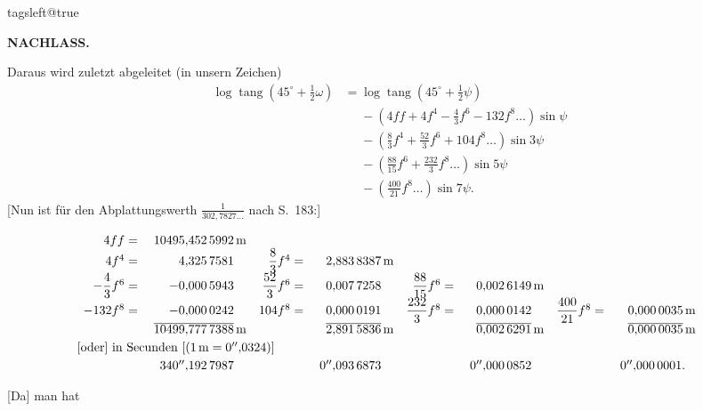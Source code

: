 \begingroup
\csname tagsleft@true\endcsname
\par\clearpage
\noindent{}\hfill{\small\textbf{NACHLASS.}}\hfill\null\par\medskip

Daraus wird zuletzt abgeleitet (in unsern Zeichen)
\[
\begin{aligned}
\log\operatorname{tang}(45^\circ+\tfrac12\omega)&=\log\operatorname{tang}(45^\circ+\tfrac12\psi)\\
&\phantom{={}}-\left(4ff+4f^4-\frac43f^6-132f^8\ldots\right)\sin\psi\\
&\phantom{={}}-\left(\frac83f^4+\frac{52}3f^6+104f^8\ldots\right)\sin3\psi\\
&\phantom{={}}-\left(\frac{88}{15}f^6+\frac{232}3f^8\ldots\right)\sin5\psi\\
&\phantom{={}}-\left(\frac{400}{21}f^8\ldots\right)\sin7\psi.
\end{aligned}
\]
[Nun ist für den Abplattungswerth \(\frac{1}{302{,}7827\ldots}\) nach S.\ 183:]
{\small\setlength{\arraycolsep}{1.5pt}
\[
\begin{array}{rr@{\quad}rr@{\quad}rr@{\quad}rr}
4ff={}&10495{,}452\,5992\,\mathrm m\\
4f^4={}&4{,}325\,7581\phantom{\,\mathrm m}
 & \dfrac83 f^4={}&2{,}883\,8387\,\mathrm m\\
-\dfrac43 f^6={}&-0{,}000\,5943\phantom{\,\mathrm m}
 & \dfrac{52}3 f^6={}&0{,}007\,7258\phantom{\,\mathrm m}
 & \dfrac{88}{15}f^6={}&0{,}002\,6149\,\mathrm m\\
-132f^8={}&-0{,}000\,0242\phantom{\,\mathrm m}
 & 104f^8={}&0{,}000\,0191\phantom{\,\mathrm m}
 & \dfrac{232}3 f^8={}&0{,}000\,0142\phantom{\,\mathrm m}
 & \dfrac{400}{21}f^8={}&0{,}000\,0035\,\mathrm m\\
 &\overline{10499{,}777\,7388}\,\mathrm m
 & &\overline{2{,}891\,5836}\,\mathrm m
 & &\overline{0{,}002\,6291}\,\mathrm m
 & &\overline{0{,}000\,0035}\,\mathrm m\\[.6ex]
\multicolumn{8}{@{}l}{\text{[oder] in Secunden [(}1\,\mathrm m=0^{\prime\prime}{,}0324\text{)]}}\\[.6ex]
 &340^{\prime\prime}{,}192\,7987\phantom{\,\mathrm m}
 & &0^{\prime\prime}{,}093\,6873\phantom{\,\mathrm m}
 & &0^{\prime\prime}{,}000\,0852\phantom{\,\mathrm m}
 & &0^{\prime\prime}{,}000\,0001.\phantom{\mathrm m}
\end{array}
\]
\par}
[Da] man hat
